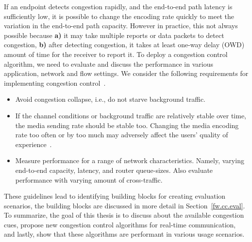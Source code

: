 If an endpoint detects congestion rapidly, and the end-to-end path latency is
sufficiently low, it is possible to change the encoding rate quickly to meet
the variation in the end-to-end path capacity. However in practice, this not
always possible because \textbf{a)} it may take multiple reports or data
packets to detect congestion, \textbf{b)} after detecting congestion, it takes
at least one-way delay (OWD) amount of time for the receiver to report it. To
deploy a congestion control algorithm, we need to evaluate and discuss the
performance in various application, network and flow settings. We consider the
following requirements for implementing congestion
control~\cite{draft.rmcat.evaluate}.

\begin{itemize}
\setlength{\itemsep}{0pt}

\item Avoid congestion collapse, i.e., do not starve background traffic.

\item If the channel conditions or background traffic are relatively stable
over time, the media sending rate should be stable too. Changing the media
encoding rate too often or by too much may adversely affect the users' quality
of experience~\cite{Zink03subjectiveimpression}.

\item Measure performance for a range of network characteristics. Namely,
varying end-to-end capacity, latency, and router queue-sizes. Also evaluate
performance with varying amount of cross-traffic.


\end{itemize}

These guidelines lead to identifying building blocks for creating evaluation
scenarios, the building blocks are discussed in more detail in
Section~\ref{fw.cc.eval}. To summarize, the goal of this thesis is to discuss
about the available congestion cues, propose new congestion control algorithms
for real-time communication, and lastly, show that these algorithms are
performant in various usage scenarios.




